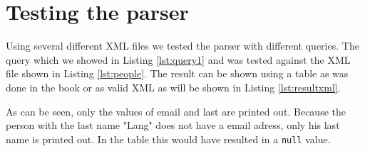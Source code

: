 \documentclass[11pt]{article}
\begin{document}
\newpage
\section{Testing the parser}
Using several different XML files we tested the parser with different queries. The query which we showed in Listing \ref{lst:query1} and was tested against the XML file shown in Listing \ref{lst:people}. The result can be shown using a table as was done in the book \cite{abiteboul2012web} or as valid XML as will be shown in Listing \ref{lst:resultxml}.



As can be seen, only the values of email and last are printed out. Because the person with the last name "Lang" does not have a email adress, only his last name is printed out. In the table this would have resulted in a \lstinline{null} value. 

\newpage
\lstlistoflistings



\end{document}

